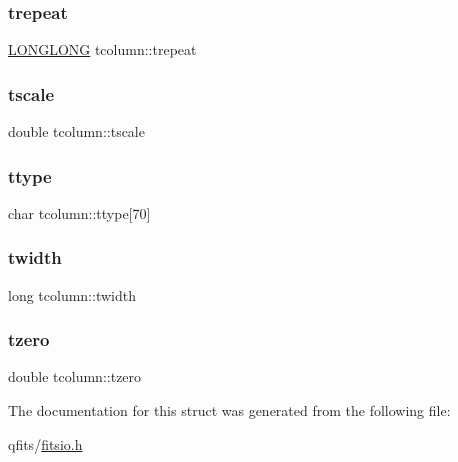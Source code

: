 \subsubsection{\texorpdfstring{trepeat}{trepeat}}
{\footnotesize\ttfamily \hyperlink{cfortran_8h_af559a7ae68520d96f21d0655d6792508}{L\+O\+N\+G\+L\+O\+NG} tcolumn\+::trepeat}

\mbox{\label{structtcolumn_acc57a3fa41ea199bb8bd6a231b6f6ba4}} 
\subsubsection{\texorpdfstring{tscale}{tscale}}
{\footnotesize\ttfamily double tcolumn\+::tscale}

\mbox{\label{structtcolumn_a51109f8576b4877be4dda2fd19775614}} 
\subsubsection{\texorpdfstring{ttype}{ttype}}
{\footnotesize\ttfamily char tcolumn\+::ttype\mbox{[}70\mbox{]}}

\mbox{\label{structtcolumn_af99694f559adfc395190b82bb702b255}} 
\subsubsection{\texorpdfstring{twidth}{twidth}}
{\footnotesize\ttfamily long tcolumn\+::twidth}

\mbox{\label{structtcolumn_a1116351871bcec610d1b835d6fc53b77}} 
\subsubsection{\texorpdfstring{tzero}{tzero}}
{\footnotesize\ttfamily double tcolumn\+::tzero}



The documentation for this struct was generated from the following file\+:\begin{DoxyCompactItemize}
\item 
qfits/\hyperlink{fitsio_8h}{fitsio.\+h}\end{DoxyCompactItemize}
